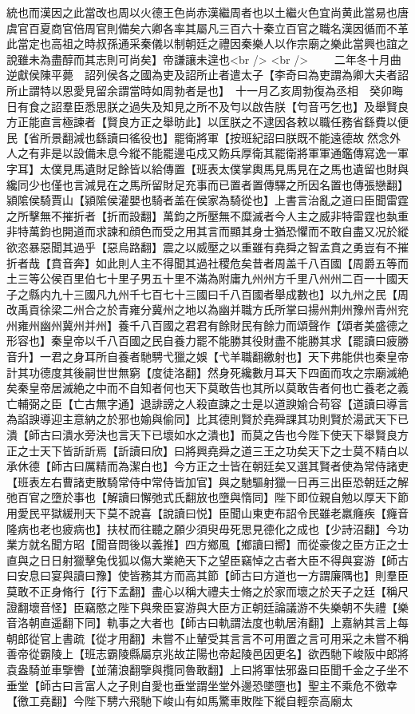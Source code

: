 統也而漢因之此當改也周以火德王色尚赤漢繼周者也以土繼火色宜尚黄此當易也唐虞官百夏商官倍周官則備矣六卿各率其屬凡三百六十秦立百官之職名漢因循而不革此當定也高祖之時叔孫通采秦儀以制朝廷之禮因秦樂人以作宗廟之樂此當興也誼之說雖未為盡醇而其志則可尚矣】帝謙讓未遑也<br />
<br />
　　二年冬十月曲逆獻侯陳平薨　詔列侯各之國為吏及詔所止者遣太子【李奇曰為吏謂為卿大夫者詔所止謂特以恩愛見留余謂當時如周勃者是也】　十一月乙亥周勃復為丞相　癸卯晦日有食之詔羣臣悉思朕之過失及知見之所不及匄以啟告朕【匄音丐乞也】及舉賢良方正能直言極諫者【賢良方正之舉昉此】以匡朕之不逮因各敕以職任務省繇費以便民【省所景翻減也繇讀曰徭役也】罷衛將軍【按班紀詔曰朕既不能遠德故然念外人之有非是以設備未息今縱不能罷邊屯戍又飭兵厚衛其罷衛將軍軍通鑑傳寫逸一軍字耳】太僕見馬遺財足餘皆以給傳置【班表太僕掌輿馬見馬見在之馬也遺留也財與纔同少也僅也言減見在之馬所留財足充事而已置者置傳驛之所因名置也傳張戀翻】潁隂侯騎賈山【潁隂侯灌嬰也騎者盖在侯家為騎從也】上書言治亂之道曰臣聞雷霆之所擊無不摧折者【折而設翻】萬鈞之所壓無不糜滅者今人主之威非特雷霆也埶重非特萬鈞也開道而求諫和顔色而受之用其言而顯其身士猶恐懼而不敢自盡又况於縱欲恣暴惡聞其過乎【惡烏路翻】震之以威壓之以重雖有堯舜之智孟賁之勇豈有不摧折者哉【賁音奔】如此則人主不得聞其過社稷危矣昔者周盖千八百國【周爵五等而土三等公侯百里伯七十里子男五十里不滿為附庸九州州方千里八州州二百一十國天子之縣内九十三國凡九州千七百七十三國曰千八百國者舉成數也】以九州之民【周改禹貢徐梁二州合之於青雍分冀州之地以為幽并職方氏所掌曰揚州荆州豫州青州兖州雍州幽州冀州并州】養千八百國之君君有餘財民有餘力而頌聲作【頌者美盛德之形容也】秦皇帝以千八百國之民自養力罷不能勝其役財盡不能勝其求【罷讀曰疲勝音升】一君之身耳所自養者馳騁弋獵之娛【弋羊職翻繳射也】天下弗能供也秦皇帝計其功德度其後嗣世世無窮【度徒洛翻】然身死纔數月耳天下四面而攻之宗廟滅絶矣秦皇帝居滅絶之中而不自知者何也天下莫敢告也其所以莫敢告者何也亡養老之義亡輔弼之臣【亡古無字通】退誹謗之人殺直諫之士是以道諛媮合苟容【道讀曰導言為諂諛導迎主意納之於邪也媮與偷同】比其德則賢於堯舜課其功則賢於湯武天下已潰【師古曰潰水旁決也言天下已壞如水之潰也】而莫之告也今陛下使天下舉賢良方正之士天下皆訢訢焉【訢讀曰欣】曰將興堯舜之道三王之功矣天下之士莫不精白以承休德【師古曰厲精而為潔白也】今方正之士皆在朝廷矣又選其賢者使為常侍諸吏【班表左右曹諸吏散騎常侍中常侍皆加官】與之馳驅射獵一日再三出臣恐朝廷之解弛百官之墮於事也【解讀曰懈弛式氏翻放也墮與惰同】陛下即位親自勉以厚天下節用愛民平獄緩刑天下莫不說喜【說讀曰悦】臣聞山東吏布詔令民雖老羸癃疾【癃音隆病也老也疲病也】扶杖而往聽之願少須臾毋死思見德化之成也【少詩沼翻】今功業方就名聞方昭【聞音問後以義推】四方鄉風【鄉讀曰嚮】而從豪俊之臣方正之士直與之日日射獵擊兔伐狐以傷大業絶天下之望臣竊悼之古者大臣不得與宴游【師古曰安息曰宴與讀曰豫】使皆務其方而高其節【師古曰方道也一方謂廉隅也】則羣臣莫敢不正身脩行【行下孟翻】盡心以稱大禮夫士脩之於家而壞之於天子之廷【稱尺證翻壞音怪】臣竊愍之陛下與衆臣宴游與大臣方正朝廷論議游不失樂朝不失禮【樂音洛朝直遥翻下同】軌事之大者也【師古曰軌謂法度也軌居洧翻】上嘉納其言上每朝郎從官上書疏【從才用翻】未嘗不止輦受其言言不可用置之言可用采之未嘗不稱善帝從霸陵上【班志霸陵縣屬京兆故芷陽也帝起陵邑因更名】欲西馳下峻阪中郎將袁盎騎並車擥轡【並蒲浪翻擥與攬同魯敢翻】上曰將軍怯邪盎曰臣聞千金之子坐不垂堂【師古曰言富人之子則自愛也垂堂謂坐堂外邊恐墜墮也】聖主不乘危不徼幸【徼工堯翻】今陛下騁六飛馳下峻山有如馬驚車敗陛下縱自輕奈高廟太